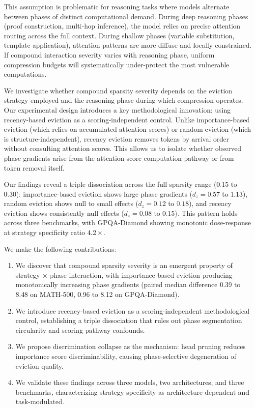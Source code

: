 \documentclass[11pt,a4paper]{article}
\begin{document}
This assumption is problematic for reasoning tasks where models alternate between phases of distinct computational demand. During deep reasoning phases (proof construction, multi-hop inference), the model relies on precise attention routing across the full context. During shallow phases (variable substitution, template application), attention patterns are more diffuse and locally constrained. If compound interaction severity varies with reasoning phase, uniform compression budgets will systematically under-protect the most vulnerable computations.

We investigate whether compound sparsity severity depends on the eviction strategy employed and the reasoning phase during which compression operates. Our experimental design introduces a key methodological innovation: using recency-based eviction as a scoring-independent control. Unlike importance-based eviction (which relies on accumulated attention scores) or random eviction (which is structure-independent), recency eviction removes tokens by arrival order without consulting attention scores. This allows us to isolate whether observed phase gradients arise from the attention-score computation pathway or from token removal itself.

Our findings reveal a triple dissociation across the full sparsity range (0.15 to 0.30): importance-based eviction shows large phase gradients ($d_z = 0.57$ to $1.13$), random eviction shows null to small effects ($d_z = 0.12$ to $0.18$), and recency eviction shows consistently null effects ($d_z = 0.08$ to $0.15$). This pattern holds across three benchmarks, with GPQA-Diamond showing monotonic dose-response at strategy specificity ratio $4.2\times$.

We make the following contributions:
\begin{enumerate}
    \item We discover that compound sparsity severity is an emergent property of strategy $\times$ phase interaction, with importance-based eviction producing monotonically increasing phase gradients (paired median difference 0.39 to 8.48 on MATH-500, 0.96 to 8.12 on GPQA-Diamond).
    \item We introduce recency-based eviction as a scoring-independent methodological control, establishing a triple dissociation that rules out phase segmentation circularity and scoring pathway confounds.
    \item We propose discrimination collapse as the mechanism: head pruning reduces importance score discriminability, causing phase-selective degeneration of eviction quality.
    \item We validate these findings across three models, two architectures, and three benchmarks, characterizing strategy specificity as architecture-dependent and task-modulated.
\end{enumerate}
\end{document}
